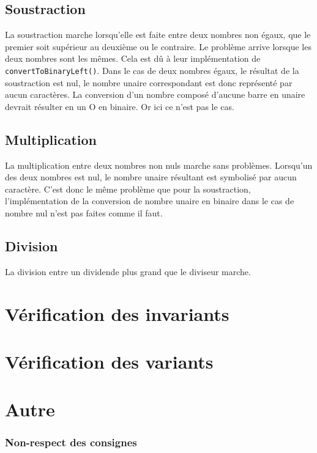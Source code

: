 \documentclass[a4paper,11pt]{article}
\begin{document}
    \subsection{Soustraction}

La soustraction marche lorsqu'elle est faite entre deux nombres non égaux, que le premier soit supérieur au deuxième ou le contraire. Le problème arrive lorsque les deux nombres sont les mêmes. Cela est dû à leur implémentation de \texttt{convertToBinaryLeft()}.
Dans le cas de deux nombres égaux, le résultat de la soustraction est nul, le nombre unaire correspondant est donc représenté par aucun caractères. La conversion d'un nombre composé d'aucune barre en unaire devrait résulter en un O en binaire. Or ici ce n'est pas le cas.

    \subsection{Multiplication}

La multiplication entre deux nombres non nuls marche sans problèmes.
Lorsqu'un des deux nombres est nul, le nombre unaire résultant est symbolisé par aucun caractère. C'est donc le même problème que pour la soustraction, l'implémentation de la conversion de nombre unaire en binaire dans le cas de nombre nul n'est pas faites comme il faut.

    \subsection{Division}

La division entre un dividende plus grand que le diviseur marche.
\section{Vérification des invariants}
\section{Vérification des variants}
\section{Autre}

    \subsubsection{Non-respect des consignes}
\end{document}
